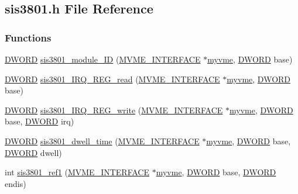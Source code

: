 \subsection{sis3801.h File Reference}
\label{sis3801_8h}
\subsubsection*{Functions}
\begin{DoxyCompactItemize}
\item 
\hyperlink{vt2_8h_a798af1e30bc65f319c1a246cecf59e39}{DWORD} \hyperlink{sis3801_8h_ae898609aaf567d5366587e8e719bdf52}{sis3801\_\-module\_\-ID} (\hyperlink{structMVME__INTERFACE}{MVME\_\-INTERFACE} $\ast$\hyperlink{fevmemodules_8c_aeab89db2ad759342a32dcd50a0a0156c}{myvme}, \hyperlink{vt2_8h_a798af1e30bc65f319c1a246cecf59e39}{DWORD} base)
\item 
\hyperlink{vt2_8h_a798af1e30bc65f319c1a246cecf59e39}{DWORD} \hyperlink{sis3801_8h_ab295ea2c9698fe3a0143103b696609d2}{sis3801\_\-IRQ\_\-REG\_\-read} (\hyperlink{structMVME__INTERFACE}{MVME\_\-INTERFACE} $\ast$\hyperlink{fevmemodules_8c_aeab89db2ad759342a32dcd50a0a0156c}{myvme}, \hyperlink{vt2_8h_a798af1e30bc65f319c1a246cecf59e39}{DWORD} base)
\item 
\hyperlink{vt2_8h_a798af1e30bc65f319c1a246cecf59e39}{DWORD} \hyperlink{sis3801_8h_a96c6849156112f3100be773221887e76}{sis3801\_\-IRQ\_\-REG\_\-write} (\hyperlink{structMVME__INTERFACE}{MVME\_\-INTERFACE} $\ast$\hyperlink{fevmemodules_8c_aeab89db2ad759342a32dcd50a0a0156c}{myvme}, \hyperlink{vt2_8h_a798af1e30bc65f319c1a246cecf59e39}{DWORD} base, \hyperlink{vt2_8h_a798af1e30bc65f319c1a246cecf59e39}{DWORD} irq)
\item 
\hyperlink{vt2_8h_a798af1e30bc65f319c1a246cecf59e39}{DWORD} \hyperlink{sis3801_8h_a30131d1123d09c8a0244ce086a72efd2}{sis3801\_\-dwell\_\-time} (\hyperlink{structMVME__INTERFACE}{MVME\_\-INTERFACE} $\ast$\hyperlink{fevmemodules_8c_aeab89db2ad759342a32dcd50a0a0156c}{myvme}, \hyperlink{vt2_8h_a798af1e30bc65f319c1a246cecf59e39}{DWORD} base, \hyperlink{vt2_8h_a798af1e30bc65f319c1a246cecf59e39}{DWORD} dwell)
\item 
int \hyperlink{sis3801_8h_a62a0e860cd93ba6b21e4b14aef66ffc7}{sis3801\_\-ref1} (\hyperlink{structMVME__INTERFACE}{MVME\_\-INTERFACE} $\ast$\hyperlink{fevmemodules_8c_aeab89db2ad759342a32dcd50a0a0156c}{myvme}, \hyperlink{vt2_8h_a798af1e30bc65f319c1a246cecf59e39}{DWORD} base, \hyperlink{vt2_8h_a798af1e30bc65f319c1a246cecf59e39}{DWORD} endis)
\item 

\end{DoxyCompactItemize}
